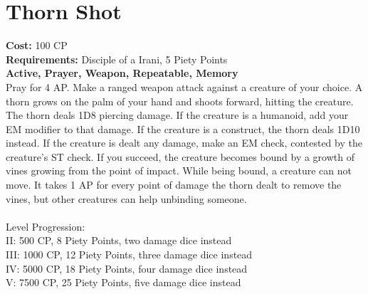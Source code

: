 \section{Thorn Shot}
\textbf{Cost:} 100 CP\\
\textbf{Requirements:} Disciple of a Irani, 5 Piety Points \\
\textbf{Active, Prayer, Weapon, Repeatable, Memory}\\
Pray for 4 AP. Make a ranged weapon attack against a creature of your choice. A thorn grows on the palm of your hand and shoots forward, hitting the creature. The thorn deals 1D8 piercing damage. If the creature is a humanoid, add your EM modifier to that damage. If the creature is a construct, the thorn deals 1D10 instead. If the creature is dealt any damage, make an EM check, contested by the creature's ST check. If you succeed, the creature becomes bound by a growth of vines growing from the point of impact. While being bound, a creature can not move. It takes 1 AP for every point of damage the thorn dealt to remove the vines, but other creatures can help unbinding someone.\\
\\
Level Progression:\\
II: 500 CP, 8 Piety Points, two damage dice instead\\
III: 1000 CP, 12 Piety Points, three damage dice instead\\
IV: 5000 CP, 18 Piety Points, four damage dice instead\\
V: 7500 CP, 25 Piety Points, five damage dice instead\\